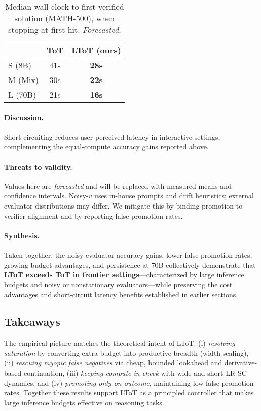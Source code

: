 \documentclass{article}
\begin{document}
\begin{table}[t]
\centering
\caption{Median wall-clock to first verified solution (MATH-500), when stopping at first hit. \emph{Forecasted}.}
\vspace{0.3em}
\begin{tabular}{lcc}
\toprule
 & \textbf{ToT} & \textbf{LToT (ours)} \\
\midrule
S (8B)  & 41s & \textbf{28s} \\
M (Mix) & 30s & \textbf{22s} \\
L (70B) & 21s & \textbf{16s} \\
\bottomrule
\end{tabular}
\label{tab:latency}
\end{table}

\paragraph{Discussion.}
Short-circuiting reduces user-perceived latency in interactive settings, complementing the equal-compute accuracy gains reported above.

\paragraph{Threats to validity.}
Values here are \emph{forecasted} and will be replaced with measured means and confidence intervals.
Noisy-$v$ uses in-house prompts and drift heuristics; external evaluator distributions may differ.
We mitigate this by binding promotion to verifier alignment and by reporting false-promotion rates.



\paragraph{Synthesis.}
Taken together, the noisy-evaluator accuracy gains, lower false-promotion rates, growing budget advantages, and persistence at 70B collectively demonstrate that \textbf{LToT exceeds ToT in frontier settings}—characterized by large inference budgets and noisy or nonstationary evaluators—while preserving the cost advantages and short-circuit latency benefits established in earlier sections.






\subsection{Takeaways}
\label{subsec:takeaways}
The empirical picture matches the theoretical intent of LToT:
(i) \emph{resolving saturation} by converting extra budget into productive breadth (width scaling),
(ii) \emph{rescuing myopic false negatives} via cheap, bounded lookahead and derivative-based continuation,
(iii) \emph{keeping compute in check} with wide-and-short LR-SC dynamics, and
(iv) \emph{promoting only on outcome}, maintaining low false promotion rates.
Together these results support LToT as a principled controller that makes large inference budgets effective on reasoning tasks.
\end{document}
